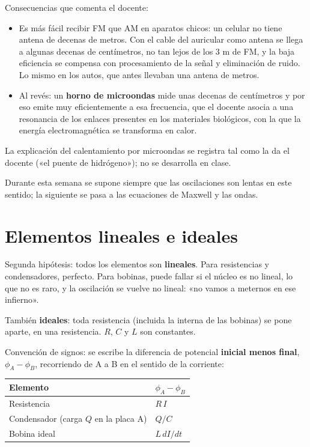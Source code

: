 \documentclass[12pt,a4paper]{article}
\begin{document}
Consecuencias que comenta el docente:

\begin{itemize}
  \item Es más fácil recibir FM que AM en aparatos chicos: un celular no tiene antena
  de decenas de metros. Con el cable del auricular como antena se llega a
  algunas decenas de centímetros, no tan lejos de los 3 m de FM, y la baja
  eficiencia se compensa con procesamiento de la señal y eliminación de ruido.
  Lo mismo en los autos, que antes llevaban una antena de metros.
  \item Al revés: un \textbf{horno de microondas} mide unas decenas de centímetros y por
  eso emite muy eficientemente a esa frecuencia, que el docente asocia a una
  resonancia de los enlaces presentes en los materiales biológicos, con la que
  la energía electromagnética se transforma en calor.
\end{itemize}

\begin{notebox}
La explicación del calentamiento por microondas se registra tal como la da
el docente («el puente de hidrógeno»); no se desarrolla en clase.
\end{notebox}

Durante esta semana se supone siempre que las oscilaciones son lentas en este
sentido; la siguiente se pasa a las ecuaciones de Maxwell y las ondas.

\section{Elementos lineales e ideales}

Segunda hipótesis: todos los elementos son \textbf{lineales}. Para resistencias y
condensadores, perfecto. Para bobinas, puede fallar si el núcleo es no lineal,
lo que no es raro, y la oscilación se vuelve no lineal: «no vamos a meternos en
ese infierno».

También \textbf{ideales}: toda resistencia (incluida la interna de las bobinas) se
pone aparte, en una resistencia. $R$, $C$ y $L$ son constantes.

Convención de signos: se escribe la diferencia de potencial \textbf{inicial menos
final}, $\phi_A - \phi_B$, recorriendo de A a B en el sentido de la corriente:

\begin{center}
\renewcommand{\arraystretch}{1.35}
\small
\begin{tabularx}{\textwidth}{>{\raggedright\arraybackslash}X>{\raggedright\arraybackslash}X}
\toprule
\textbf{Elemento} & \textbf{$\phi_A - \phi_B$} \\
\midrule
Resistencia & $R\,I$ \\
Condensador (carga $Q$ en la placa A) & $Q/C$ \\
Bobina ideal & $L\,dI/dt$ \\
\bottomrule
\end{tabularx}
\end{center}
\end{document}

